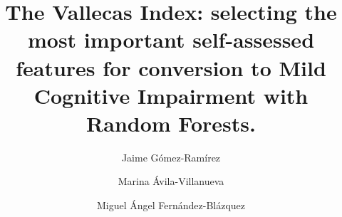 \documentclass[preprint,12pt]{elsarticle}
\begin{document}
\begin{frontmatter}



\title{The Vallecas Index: selecting the most important self-assessed features for conversion to Mild Cognitive Impairment with Random Forests.}


\author{Jaime Gómez-Ramírez}
\author{Marina Ávila-Villanueva}
\author{Miguel Ángel Fernández-Blázquez}

\address{Fundaci\'on Reina Sof\'ia \\     Centre for Research in Neurodegenarative Diseases (Fundaci\'on CIEN) \\ \emph{Valderrebollo, 5, 28031 Madrid, Spain}}



\end{frontmatter}
\end{document}
